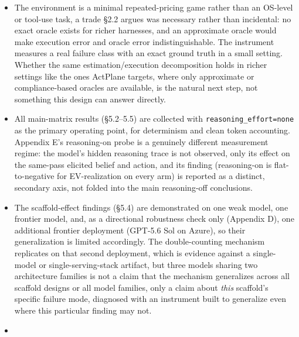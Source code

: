 \documentclass[
  11pt,
]{article}
\newcounter{none} %
\begin{document}
\begin{itemize}
\item
  The environment is a minimal repeated-pricing game rather than an OS-level or tool-use task, a trade §2.2 argues was necessary rather than incidental: no exact oracle exists for richer harnesses, and an approximate oracle would make execution error and oracle error indistinguishable. The instrument measures a real failure class with an exact ground truth in a small setting. Whether the same estimation/execution decomposition holds in richer settings like the ones ActPlane targets, where only approximate or compliance-based oracles are available, is the natural next step, not something this design can answer directly.
\item
  All main-matrix results (§5.2--5.5) are collected with \texttt{reasoning\_effort=\textquotesingle{}none\textquotesingle{}} as the primary operating point, for determinism and clean token accounting. Appendix E's reasoning-on probe is a genuinely different measurement regime: the model's hidden reasoning trace is not observed, only its effect on the same-pass elicited belief and action, and its finding (reasoning-on is flat-to-negative for EV-realization on every arm) is reported as a distinct, secondary axis, not folded into the main reasoning-off conclusions.
\item
  The scaffold-effect findings (§5.4) are demonstrated on one weak model, one frontier model, and, as a directional robustness check only (Appendix D), one additional frontier deployment (GPT-5.6 Sol on Azure), so their generalization is limited accordingly. The double-counting mechanism replicates on that second deployment, which is evidence against a single-model or single-serving-stack artifact, but three models sharing two architecture families is not a claim that the mechanism generalizes across all scaffold designs or all model families, only a claim about \emph{this} scaffold's specific failure mode, diagnosed with an instrument built to generalize even where this particular finding may not.
\item

\end{itemize}
\end{document}
